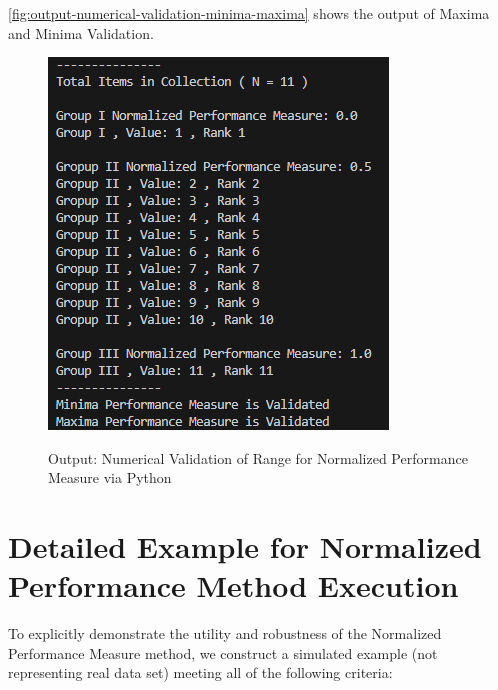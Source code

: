 \documentclass[a4paper,fleqn,review]{cas-sc}
\begin{document}
\autoref{fig:output-numerical-validation-minima-maxima} shows the output of Maxima and Minima Validation.
\begin{figure}
	\caption{Output: Numerical Validation of Range for Normalized Performance Measure via Python}
	\centering
	\includegraphics [scale=1]{output-validation-minima-maxima.png}
	\label{fig:output-numerical-validation-minima-maxima}
\end{figure}


\section{Detailed Example for Normalized Performance Method Execution}

To explicitly demonstrate the utility and robustness of the Normalized Performance Measure method, we construct a simulated example (not representing real data set) meeting all of the following criteria:
\end{document}
